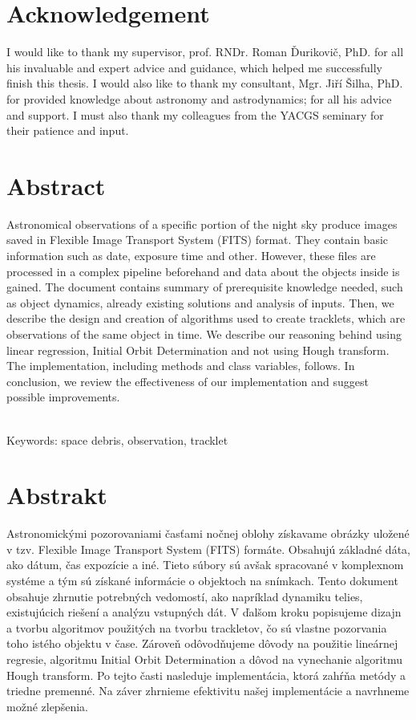 \documentclass[12pt, a4paper, oneside]{book}
\begin{document}
\chapter*{Acknowledgement}\label{chap:thank_you}
I would like to thank my supervisor, prof. RNDr. Roman Ďurikovič, PhD. for all his invaluable and expert advice and guidance, which helped me successfully finish this thesis. I would also like to thank my consultant, Mgr. Jiří Šilha, PhD. for provided knowledge about astronomy and astrodynamics; for all his advice and support. I must also thank my colleagues from the YACGS seminary for their patience and input.
\vfill\eject 

\chapter*{Abstract}\label{chap:abstract_en}
Astronomical observations of a specific portion of the night sky produce images saved in Flexible Image Transport System (FITS) format. They contain basic information such as date, exposure time and other. However, these files are processed in a complex pipeline beforehand and data about the objects inside is gained. The document contains summary of prerequisite knowledge needed, such as object dynamics, already existing solutions and analysis of inputs. Then, we describe the design and creation of algorithms used to create tracklets, which are observations of the same object in time. We describe our reasoning behind using linear regression, Initial Orbit Determination and not using Hough transform. The implementation, including methods and class variables, follows. In conclusion, we review the effectiveness of our implementation and suggest possible improvements.

~\\
Keywords: space debris, observation, tracklet
\vfill\eject 

\chapter*{Abstrakt}\label{chap:abstract_sk}
Astronomickými pozorovaniami časťami nočnej oblohy získavame obrázky uložené v tzv. Flexible Image Transport System (FITS) formáte. Obsahujú základné dáta, ako dátum, čas expozície a iné. Tieto súbory sú avšak spracované v komplexnom systéme a tým sú získané informácie o objektoch na snímkach. Tento dokument obsahuje zhrnutie potrebných vedomostí, ako napríklad dynamiku telies, existujúcich riešení a analýzu vstupných dát. V ďalšom kroku popisujeme dizajn a tvorbu algoritmov použitých na tvorbu trackletov, čo sú vlastne pozorvania toho istého objektu v čase. Zároveň odôvodňujeme dôvody na použitie lineárnej regresie, algoritmu Initial Orbit Determination a dôvod na vynechanie algoritmu Hough transform. Po tejto časti nasleduje implementácia, ktorá zahŕňa metódy a triedne premenné. Na záver zhrnieme efektivitu našej implementácie a navrhneme možné zlepšenia.
\end{document}
